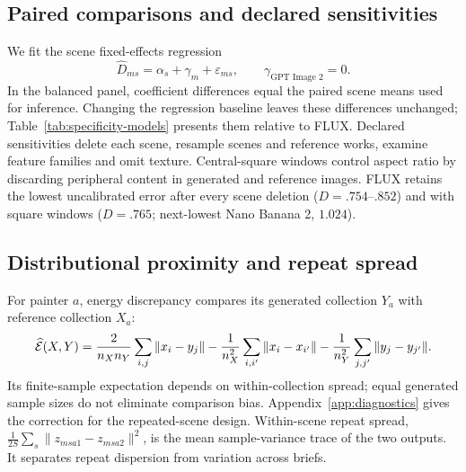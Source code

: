 \subsection{Paired comparisons and declared sensitivities}\label{app:declared-sensitivities}
We fit the scene fixed-effects regression
\begin{equation}
 \widehat D_{ms}=\alpha_s+\gamma_m+\varepsilon_{ms},
 \qquad\gamma_{\text{GPT Image 2}}=0.
 \label{eq:regression}
\end{equation}
In the balanced panel, coefficient differences equal the paired scene means
used for inference. Changing the regression baseline leaves these differences
unchanged; Table~\ref{tab:specificity-models} presents them relative to FLUX.
Declared sensitivities delete each scene, resample scenes
and reference works, examine feature families and omit texture. Central-square
windows control aspect ratio by discarding peripheral content in generated and
reference images. FLUX retains the lowest uncalibrated error after every scene
deletion ($D=.754$--$.852$) and with square windows ($D=.765$; next-lowest
Nano Banana 2, $1.024$).

\subsection{Distributional proximity and repeat spread}
For painter $a$, energy discrepancy compares its generated collection $Y_a$
with reference collection $X_a$:
\begin{equation}
 \widehat{\mathcal E}(X,Y)=\frac{2}{n_Xn_Y}\sum_{i,j}\|x_i-y_j\|
 -\frac1{n_X^2}\sum_{i,i'}\|x_i-x_{i'}\|
 -\frac1{n_Y^2}\sum_{j,j'}\|y_j-y_{j'}\|.
 \label{eq:energy}
\end{equation}
Its finite-sample expectation depends on within-collection spread; equal
generated sample sizes do not eliminate comparison bias. Appendix~\ref{app:diagnostics}
gives the correction for the repeated-scene design. Within-scene repeat spread,
$\frac{1}{2S}\sum_s\|z_{msa1}-z_{msa2}\|^2$, is the mean sample-variance
trace of the two outputs. It separates repeat dispersion from variation across
briefs.
